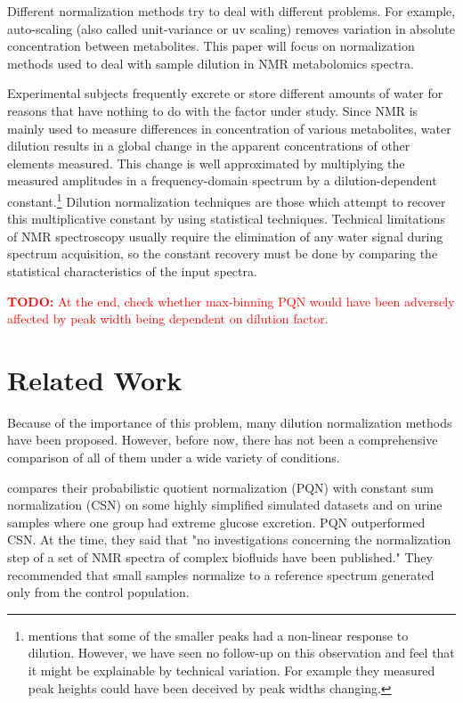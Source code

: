 \documentclass[english]{article}
\newcommand{\todo}[1]{\textcolor{red}{\textbf{TODO:} #1}}
\begin{document}
Different normalization methods try to deal with different problems. For example, auto-scaling (also called unit-variance or uv scaling) removes variation in absolute concentration between metabolites\cite{VanDenBerg2006}. This paper will focus on normalization methods used to deal with sample dilution in NMR metabolomics spectra.

Experimental subjects frequently excrete or store different amounts of water for reasons that have nothing to do with the factor under study. Since NMR is mainly used to measure differences in concentration of various metabolites, water dilution results in a global change in the apparent concentrations of other elements measured. This change is well approximated by multiplying the measured amplitudes in a frequency-domain spectrum by a dilution-dependent constant.\footnote{\citep{Zhang2009a} mentions that some of the smaller peaks had a non-linear response to dilution. However, we have seen no follow-up on this observation and feel that it might be explainable by technical variation. For example they measured peak heights could have been deceived by peak widths changing.} Dilution normalization techniques are those which attempt to recover this multiplicative constant by using statistical techniques. Technical limitations of NMR spectroscopy usually require the elimination of any water signal during spectrum acquisition, so the constant recovery must be done by comparing the statistical characteristics of the input spectra.

\todo{At the end, check whether max-binning PQN would have been adversely affected by peak width being dependent on dilution factor.}

\section{Related Work}
Because of the importance of this problem, many dilution normalization methods have been proposed. However, before now, there has not been a comprehensive comparison of all of them under a wide variety of conditions.

\citep{VanDenBerg2006} compares their probabilistic quotient normalization (PQN) with constant sum normalization (CSN) on some highly simplified simulated datasets and on urine samples where one group had extreme glucose excretion. PQN outperformed CSN. At the time, they said that "no investigations concerning the normalization step of a set of NMR spectra of complex biofluids have been published." They recommended that small samples normalize to a reference spectrum generated only from the control population.
\end{document}
